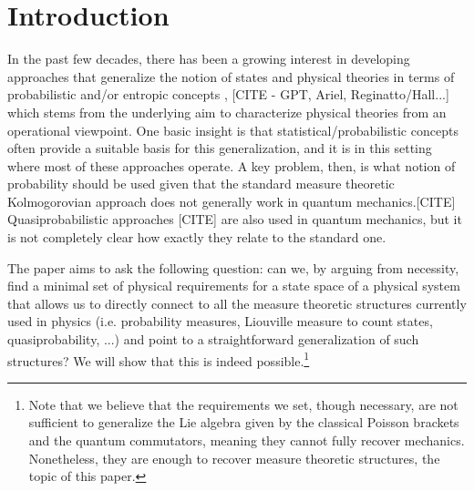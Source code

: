 \documentclass[10pt,twocolumn, nofootinbib]{revtex4-2}
\begin{document}
\section{Introduction}

In the past few decades, there has been a growing interest in developing approaches that generalize the notion of states and physical theories in terms of probabilistic and/or entropic concepts \cite{plavala2023,ariano2017,caticha2019,hall2016}, [CITE - GPT, Ariel, Reginatto/Hall...] which stems from the underlying aim to characterize physical theories from an operational viewpoint. One basic insight is that statistical/probabilistic concepts often provide a suitable basis for this generalization, and it is in this setting where most of these approaches operate. A key problem, then, is what notion of probability should be used given that the standard measure theoretic Kolmogorovian approach does not generally work in quantum mechanics\cite{chsh1969}.[CITE] Quasiprobabilistic approaches \cite{ferrie10,mandel1995,monchietti2025} [CITE] are also used in quantum mechanics, but it is not completely clear how exactly they relate to the standard one.

The paper aims to ask the following question: can we, by arguing from necessity, find a minimal set of physical requirements for a state space of a physical system that allows us to directly connect to all the measure theoretic structures currently used in physics (i.e. probability measures, Liouville measure to count states, quasiprobability, ...) and point to a straightforward generalization of such structures? We will show that this is indeed possible.\footnote{Note that we believe that the requirements we set, though necessary, are not sufficient to generalize the Lie algebra given by the classical Poisson brackets and the quantum commutators, meaning they cannot fully recover mechanics. Nonetheless, they are enough to recover measure theoretic structures, the topic of this paper.}
\end{document}
